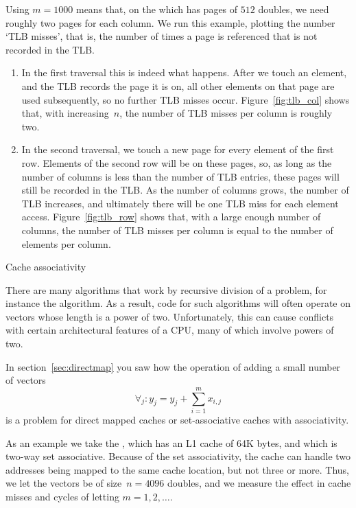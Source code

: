 Using $m=1000$ means that, on the  which
has pages of $512$ doubles, we need roughly two pages for each
column. We run this example, plotting the number `TLB misses', that
is, the number of times a page is referenced that is not recorded in
the TLB.
\begin{enumerate}
\item In the first traversal this is indeed what happens. After we
  touch an element, and the TLB records the page it is on, all other
  elements on that page are used subsequently, so no further TLB
  misses occur. Figure~\ref{fig:tlb_col} shows that, with increasing~$n$,
  the number of TLB misses per column is roughly two.
\item In the second traversal, we touch a new page for every element
  of the first row. Elements of the second row will be on these pages,
  so, as long as the number of columns is less than the number of TLB
  entries, these pages will still be recorded in the TLB. As the
  number of columns grows, the number of TLB increases, and ultimately
  there will be one TLB miss for each element
  access. Figure~\ref{fig:tlb_row} shows that, with a large enough number
  of columns, the number of TLB misses per column is equal to the
  number of elements per column.
\end{enumerate}

 {Cache associativity}
\label{sec:assoc-coding}

There are many algorithms that work by recursive division of a
problem, for instance the  algorithm. As a result, code
for such algorithms will often operate on vectors whose length is a power of
two. Unfortunately, this can cause conflicts with certain
architectural features of a CPU, many of which involve powers of two.

In section~\ref{sec:directmap} you saw how
the operation of adding a small number of vectors
\[ \forall_j\colon y_j= y_j+\sum_{i=1}^mx_{i,j} \]
is a problem for direct mapped caches or set-associative caches with
associativity.

As an example we take the
, which has an L1 cache of 64K bytes, and
which is two-way set associative. Because of the set associativity,
the cache can handle two addresses being mapped to the same cache
location, but not three or more. Thus, we let the vectors be of
size~$n=4096$ doubles, and we measure the effect in cache misses and
cycles of letting $m=1,2,\ldots$.

